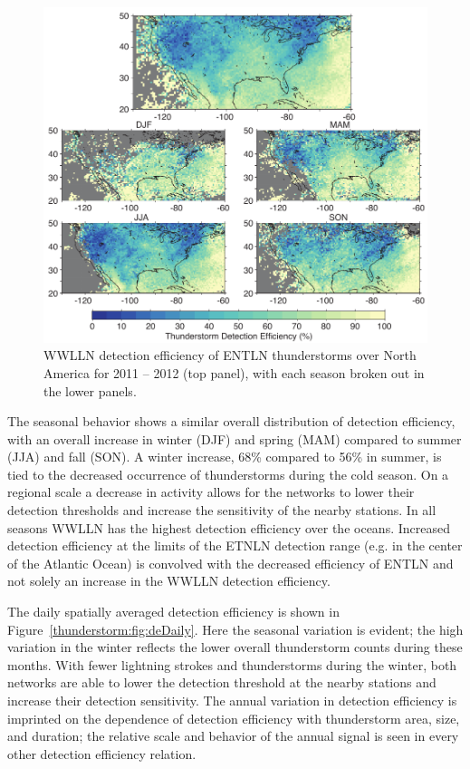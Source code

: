 \begin{figure}[ht!]
   \centering
   \includegraphics[scale=1]{thunderstorm/Figures/deMap.pdf}
   \caption{WWLLN detection efficiency of ENTLN thunderstorms over North America for 2011 -- 2012 (top panel), with each season broken out in the lower panels.}
   \label{thunderstorm:fig:deMap}
\end{figure}

The seasonal behavior shows a similar overall distribution of detection efficiency, with an overall increase in winter (DJF) and spring (MAM) compared to summer (JJA) and fall (SON).
A winter increase, 68\% compared to 56\% in summer, is tied to the decreased occurrence of thunderstorms during the cold season.
On a regional scale a decrease in activity allows for the networks to lower their detection thresholds and increase the sensitivity of the nearby stations.
In all seasons WWLLN has the highest detection efficiency over the oceans.
Increased detection efficiency at the limits of the ETNLN detection range (e.g. in the center of the Atlantic Ocean) is convolved with the decreased efficiency of ENTLN and not solely an increase in the WWLLN detection efficiency.

The daily spatially averaged detection efficiency is shown in Figure~\ref{thunderstorm:fig:deDaily}.
Here the seasonal variation is  evident; the high variation in the winter reflects the lower overall thunderstorm counts during these months.
With fewer lightning strokes and thunderstorms during the winter, both networks are able to lower the detection threshold at the nearby stations and increase their detection sensitivity.
The annual variation in detection efficiency is imprinted on the dependence of detection efficiency with thunderstorm area, size, and duration; the relative scale and behavior of the annual signal is seen in every other detection efficiency relation.

